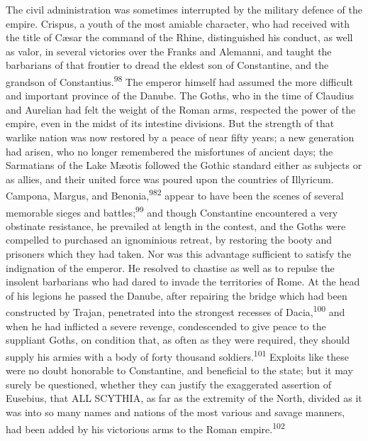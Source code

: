 The civil administration was sometimes interrupted by the
military defence of the empire. Crispus, a youth of the most
amiable character, who had received with the title of Cæsar the
command of the Rhine, distinguished his conduct, as well as
valor, in several victories over the Franks and Alemanni, and
taught the barbarians of that frontier to dread the eldest son of
Constantine, and the grandson of Constantius.\textsuperscript{98} The emperor
himself had assumed the more difficult and important province of
the Danube. The Goths, who in the time of Claudius and Aurelian
had felt the weight of the Roman arms, respected the power of the
empire, even in the midst of its intestine divisions. But the
strength of that warlike nation was now restored by a peace of
near fifty years; a new generation had arisen, who no longer
remembered the misfortunes of ancient days; the Sarmatians of the
Lake Mæotis followed the Gothic standard either as subjects or as
allies, and their united force was poured upon the countries of
Illyricum. Campona, Margus, and Benonia,\textsuperscript{982} appear to have been
the scenes of several memorable sieges and battles;\textsuperscript{99} and though
Constantine encountered a very obstinate resistance, he prevailed
at length in the contest, and the Goths were compelled to
purchased an ignominious retreat, by restoring the booty and
prisoners which they had taken. Nor was this advantage sufficient
to satisfy the indignation of the emperor. He resolved to
chastise as well as to repulse the insolent barbarians who had
dared to invade the territories of Rome. At the head of his
legions he passed the Danube, after repairing the bridge which
had been constructed by Trajan, penetrated into the strongest
recesses of Dacia,\textsuperscript{100} and when he had inflicted a severe
revenge, condescended to give peace to the suppliant Goths, on
condition that, as often as they were required, they should
supply his armies with a body of forty thousand soldiers.\textsuperscript{101}
Exploits like these were no doubt honorable to Constantine, and
beneficial to the state; but it may surely be questioned, whether
they can justify the exaggerated assertion of Eusebius, that ALL
SCYTHIA, as far as the extremity of the North, divided as it was
into so many names and nations of the most various and savage
manners, had been added by his victorious arms to the Roman
empire.\textsuperscript{102}


